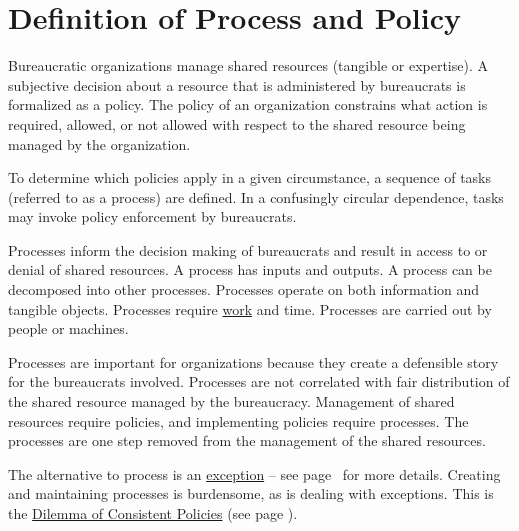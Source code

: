 \section{Definition of Process and Policy\label{sec:definition-of-process}}


Bureaucratic organizations manage shared resources (tangible or expertise). 
A subjective decision about a resource that is administered by bureaucrats is formalized as a \gls{policy}.
The policy of an organization constrains what action is required, allowed, or not allowed with respect to the shared resource being managed by the organization.

To determine which policies apply in a given circumstance, a sequence of tasks (referred to as a \gls{process}) are defined. 
In a confusingly circular dependence, tasks may invoke policy enforcement by bureaucrats. 

Processes inform the decision making of bureaucrats and result in access to or denial of shared resources. 
A process has inputs and outputs. 
A process can be decomposed into other processes. 
Processes operate on both information and tangible objects. 
Processes require \href{https://en.wikipedia.org/wiki/Work_(physics)}{work}
and time. 
Processes are carried out by people or machines.

Processes are important for organizations because they create a defensible story for the bureaucrats involved. Processes are not correlated with fair distribution of the shared resource managed by the bureaucracy. Management of shared resources require policies, and implementing policies require processes. The processes are one step removed from the management of the shared resources. 


The alternative to process is an \hyperref[sec:exceptions-to-process]{exception} -- see 
 page~\pageref{sec:exceptions-to-process} 
 for more details. 
Creating and maintaining processes is burdensome, as is dealing with exceptions. This is the \hyperref[table:policy-consistency-across-cases]{Dilemma of Consistent Policies} (see page \pageref{table:policy-consistency-across-cases}).

\ \\

